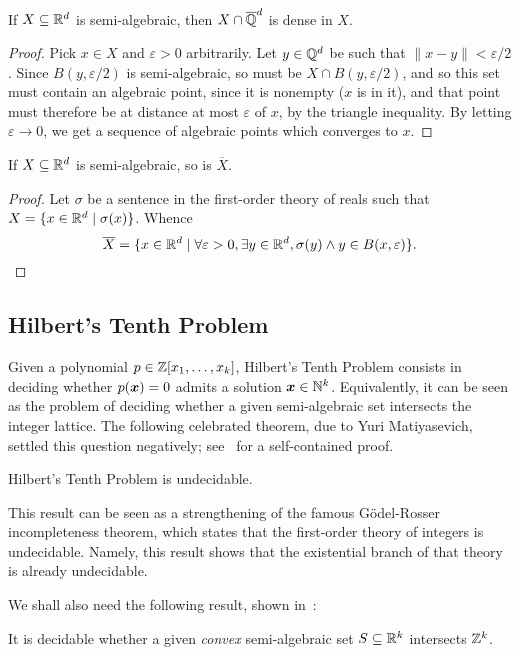 \begin{lemma}
If $X\subseteq\mathbb{R}^{d}$ is semi-algebraic, then $X\cap\overline{\mathbb{Q}}^{d}$ is dense in $X$.
\end{lemma}

\begin{proof}
  Pick $x\in X$ and $\varepsilon>0$ arbitrarily. Let
  $y\in\mathbb{Q}^{d}$ be such that $\| x-y \|<\varepsilon/2$. Since
  $B(y,\varepsilon/2)$ is semi-algebraic, so must be $X\cap
  B(y,\varepsilon/2)$, and so this set must contain an algebraic
  point, since it is nonempty ($x$ is in it), and that point must
  therefore be at distance at most $\varepsilon$ of $x$, by the
  triangle inequality. By letting $\varepsilon\rightarrow 0$, we get
  a sequence of algebraic points which converges to $x$.
\end{proof}

\begin{lemma}
If $X\subseteq\mathbb{R}^{d}$ is semi-algebraic, so is $\overline{X}$.
\end{lemma}

\begin{proof}
  Let $\sigma$ be a sentence in the first-order theory of reals such
  that $X=\lbrace x\in\mathbb{R}^{d}\mid \sigma(x)\rbrace$. Whence
\begin{equation*}
  \overline{X}=\lbrace x\in\mathbb{R}^{d}\mid
\forall \varepsilon>0,\exists y\in\mathbb{R}^{d},\sigma(y)\wedge y\in B(x,\varepsilon) \rbrace .
\end{equation*}
\end{proof}

\subsection{Hilbert's Tenth Problem}
Given a polynomial $p \in \mathbb{Z}[x_{1}, \ldots, x_{k}]$, Hilbert's Tenth Problem consists in deciding whether $p(\boldsymbol{x}) = 0$ admits a solution $\boldsymbol{x} \in \mathbb{N}^{k}$. Equivalently, it can be seen as the problem of deciding whether a given semi-algebraic set intersects the integer lattice. The following celebrated theorem, due to Yuri Matiyasevich, settled this question negatively; see~\cite{HTP} for a self-contained proof.
\begin{theorem}[Matiyasevich]
Hilbert's Tenth Problem is undecidable.
\end{theorem}
This result can be seen as a strengthening of the famous G\"{o}del-Rosser incompleteness theorem, which states that the first-order theory of integers is undecidable. Namely, this result shows that the existential branch of that theory is already undecidable.

We shall also need the following result, shown in~\cite{KP}:
\begin{theorem}
\label{thm:KP}
It is decidable whether a given \emph{convex} semi-algebraic set $S \subseteq \mathbb{R}^{k}$ intersects $\mathbb{Z}^{k}$.
\end{theorem}
